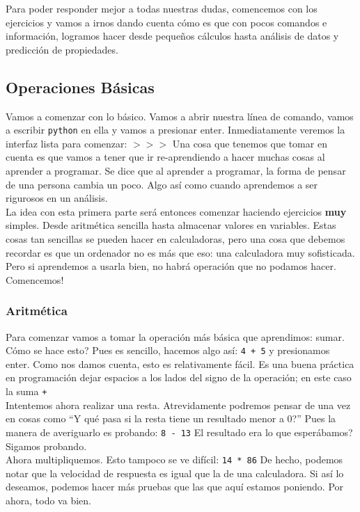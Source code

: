 \documentclass[10pt,letterpaper]{article}
\newcommand{\inlinecode}[1]{
\colorbox{light-gray}{\texttt{#1}}
}
\begin{document}
Para poder responder mejor a todas nuestras dudas, comencemos con los ejercicios y vamos a irnos dando cuenta c\'omo es que con pocos comandos e informaci\'on, logramos hacer desde peque\~nos c\'alculos hasta an\'alisis de datos y predicci\'on de propiedades.\\

\subsection{Operaciones B\'asicas}
Vamos a comenzar con lo b\'asico. Vamos a abrir nuestra l\'inea de comando, vamos a escribir \inlinecode{python} en ella y vamos a presionar enter. Inmediatamente veremos la interfaz lista para comenzar: \inlinecode{$>>>$} Una cosa que tenemos que tomar en cuenta es que vamos a tener que ir re-aprendiendo a hacer muchas cosas al aprender a programar. Se dice que al aprender a programar, la forma de pensar de una persona cambia un poco. Algo as\'i como cuando aprendemos a ser rigurosos en un an\'alisis.\\

La idea con esta primera parte ser\'a entonces comenzar haciendo ejercicios \textbf{muy} simples. Desde aritm\'etica sencilla hasta almacenar valores en variables. Estas cosas tan sencillas se pueden hacer en calculadoras, pero una cosa que debemos recordar es que un ordenador no es m\'as que eso: una calculadora muy sofisticada. Pero si aprendemos a usarla bien, no habr\'a operaci\'on que no podamos hacer. Comencemos!

\subsubsection{Aritm\'etica}
Para comenzar vamos a tomar la operaci\'on m\'as b\'asica que aprendimos: sumar. C\'omo se hace esto? Pues es sencillo, hacemos algo as\'i: \inlinecode{4\ +\ 5} y presionamos enter. Como nos damos cuenta, esto es relativamente f\'acil. Es una buena pr\'actica en programaci\'on dejar espacios a los lados del signo de la operaci\'on; en este caso la suma \inlinecode{+}\\

Intentemos ahora realizar una resta. Atrevidamente podremos pensar de una vez en cosas como ``Y qu\'e pasa si la resta tiene un resultado menor a 0?'' Pues la manera de averiguarlo es probando: \inlinecode{8\ -\ 13} El resultado era lo que esper\'abamos? Sigamos probando.\\

Ahora multipliquemos. Esto tampoco se ve dif\'icil: \inlinecode{14\ *\ 86} De hecho, podemos notar que la velocidad de respuesta es igual que la de una calculadora. Si as\'i lo deseamos, podemos hacer m\'as pruebas que las que aqu\'i estamos poniendo. Por ahora, todo va bien.\\
\end{document}
